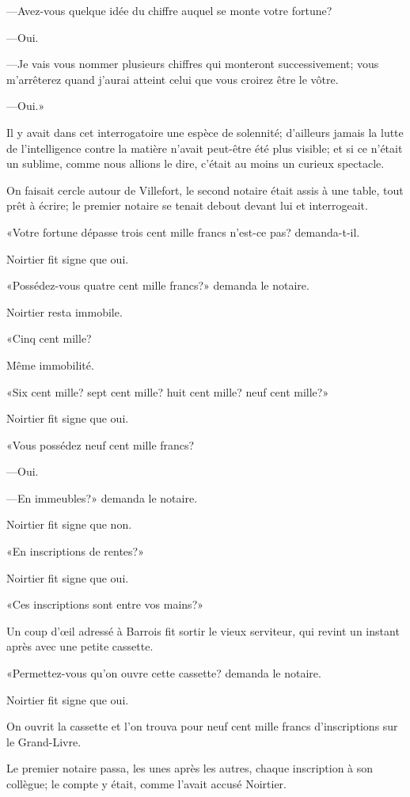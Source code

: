 —Avez-vous quelque idée du chiffre auquel se monte votre fortune? 

—Oui. 

—Je vais vous nommer plusieurs chiffres qui monteront successivement; vous m'arrêterez quand j'aurai atteint celui que vous croirez être le vôtre. 

—Oui.» 

Il y avait dans cet interrogatoire une espèce de solennité; d'ailleurs jamais la lutte de l'intelligence contre la matière n'avait peut-être été plus visible; et si ce n'était un sublime, comme nous allions le dire, c'était au moins un curieux spectacle. 

On faisait cercle autour de Villefort, le second notaire était assis à une table, tout prêt à écrire; le premier notaire se tenait debout devant lui et interrogeait. 

«Votre fortune dépasse trois cent mille francs n'est-ce pas? demanda-t-il. 

Noirtier fit signe que oui. 

«Possédez-vous quatre cent mille francs?» demanda le notaire. 

Noirtier resta immobile. 

«Cinq cent mille? 

Même immobilité.  

«Six cent mille? sept cent mille? huit cent mille? neuf cent mille?» 

Noirtier fit signe que oui. 

«Vous possédez neuf cent mille francs? 

—Oui. 

—En immeubles?» demanda le notaire. 

Noirtier fit signe que non. 

«En inscriptions de rentes?» 

Noirtier fit signe que oui. 

«Ces inscriptions sont entre vos mains?» 

Un coup d'œil adressé à Barrois fit sortir le vieux serviteur, qui revint un instant après avec une petite cassette. 

«Permettez-vous qu'on ouvre cette cassette? demanda le notaire. 

Noirtier fit signe que oui. 

On ouvrit la cassette et l'on trouva pour neuf cent mille francs d'inscriptions sur le Grand-Livre. 

Le premier notaire passa, les unes après les autres, chaque inscription à son collègue; le compte y était, comme l'avait accusé Noirtier. 


